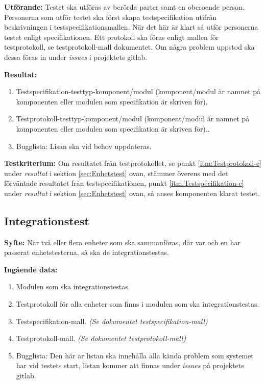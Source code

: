 \documentclass[a4paper,10pt]{article}
\begin{document}
    \textbf{Utförande:} Testet ska utföras av berörda parter samt en oberoende person. Personerna som utför testet ska först skapa testspecifikation utifrån beskrivningen i testspecifikationsmallen. När det här är klart så utför personerna testet enligt specifikationen. Ett protokoll ska föras enligt mallen för testprotokoll, se testprotokoll-mall dokumentet. Om några problem uppstod ska dessa föras in under \emph{issues} i projektets gitlab.

    \textbf{Resultat:}
        \begin{enumerate}
            \item \label{itm:Testspecifikation-e} Testspecifikation-testtyp-komponent/modul (komponent/modul är namnet på komponenten eller modulen som specifikation är skriven för).
            \item \label{itm:Testprotokoll-e} Testprotokoll-testtyp-komponent/modul (komponent/modul är namnet på komponenten eller modulen som specifikation är skriven för)..
            \item Bugglista: Lisan ska vid behov uppdateras.
        \end{enumerate}
    \textbf{Testkriterium:} Om resultatet från testprotokollet, se punkt \ref{itm:Testprotokoll-e} under \emph{resultat} i sektion \ref{sec:Enhetstest} ovan, stämmer överens med det förväntade resultatet från testspecifikationen, punkt \ref{itm:Testspecifikation-e} under \emph{resultat} i sektion \ref{sec:Enhetstest} ovan, så anses komponenten klarat testet.

\subsection{Integrationstest}
\label{sec:Integrationstest}
\textbf{Syfte:}
När två eller flera enheter som ska sammanföras, där var och en har passerat enhetstesterna, så ska de integrationstestas.

\textbf{Ingående data:}
    \begin{enumerate}
        \item Modulen som ska integrationstestas.
        \item Testprotokoll för alla enheter som finns i modulen som ska integrationstestas.
        \item Testspecifikation-mall. \emph{(Se dokumentet testspecifikation-mall)}
        \item Testprotokoll-mall. \emph{(Se dokumentet testprotokoll-mall)}
        \item Bugglista: Den här är listan ska innehålla alla kända problem som systemet har vid testets start, listan kommer att finnas under \emph{issues} på projektets gitlab.
    \end{enumerate}
\end{document}
